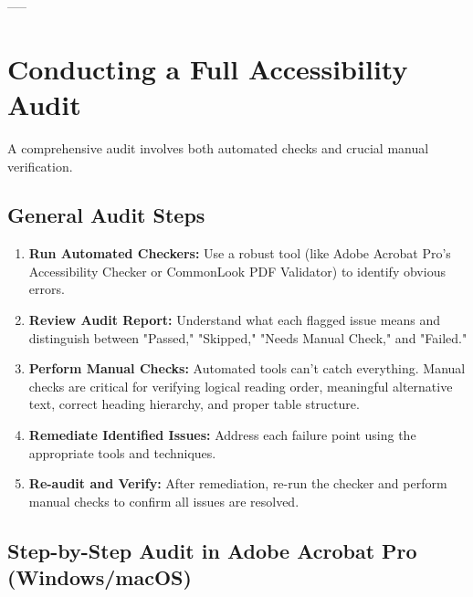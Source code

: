 -----

\section{Conducting a Full Accessibility Audit}
\label{sec:conducting-audit}
A comprehensive audit involves both automated checks and crucial manual verification.

\subsection{General Audit Steps}
\label{subsec:general-audit-steps}

\begin{enumerate}

\item \textbf{Run Automated Checkers:} Use a robust tool (like Adobe Acrobat Pro's Accessibility Checker or CommonLook PDF Validator) to identify obvious errors.

\item \textbf{Review Audit Report:} Understand what each flagged issue means and distinguish between "Passed," "Skipped," "Needs Manual Check," and "Failed."

\item \textbf{Perform Manual Checks:} Automated tools can't catch everything. Manual checks are critical for verifying logical reading order, meaningful alternative text, correct heading hierarchy, and proper table structure.

\item \textbf{Remediate Identified Issues:} Address each failure point using the appropriate tools and techniques.

\item \textbf{Re-audit and Verify:} After remediation, re-run the checker and perform manual checks to confirm all issues are resolved.

\end{enumerate}

\subsection{Step-by-Step Audit in Adobe Acrobat Pro (Windows/macOS)}
\label{subsec:step-by-step-acrobat}

